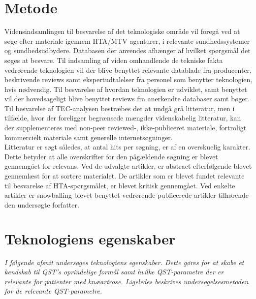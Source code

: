 \section{Metode}
Vidensindsamlingen til besvarelse af det teknologiske område vil foregå ved at søge efter materiale igennem HTA/MTV agenturer, i relevante sundhedssystemer og sundhedsudbydere. Databasen der anvendes afhænger af hvilket spørgsmål det søges at besvare. Til indsamling af viden omhandlende de tekniske fakta vedrørende teknologien vil der blive benyttet relevante datablade fra producenter, beskrivende reviews samt ekspertudtalelser fra personel som benytter teknologien, hvis nødvendig. Til besvarelse af hvordan teknologien er udviklet, samt benyttet vil der hovedsageligt blive benyttet reviews fra anerkendte databaser samt bøger.  \\
Til besvarelse af TEC-analysen bestræbes det at undgå grå litteratur, men i tilfælde, hvor der foreligger begrænsede mængder videnskabelig litteratur, kan der supplementeres med non-peer reviewed-, ikke-publiceret materiale, fortroligt kommercielt materiale samt generelle internetsøgninger. \\
Litteratur er søgt således, at antal hits per søgning, er af en overskuelig karakter. Dette betyder at alle overskrifter for den pågældende søgning er blevet gennemgået for relevans. Ved de udvalgte artikler, er abstract efterfølgende blevet gennemlæst for at sortere materialet. De artikler som er blevet fundet relevante til besvarelse af HTA-spørgsmålet, er blevet kritisk gennemgået. Ved enkelte artikler er snowballing blevet benyttet vedrørende publicerede artikler tilhørende den undersøgte forfatter. \citep{HTAcore}

\section{Teknologiens egenskaber}
\textit{I følgende afsnit undersøges teknologiens egenskaber. Dette gøres for at skabe et kendskab til QST's oprindelige formål samt hvilke QST-parametre der er relevante for patienter med knæartrose. Ligeledes beskrives undersøgelsesmetoden for de relevante QST-parametre.}

